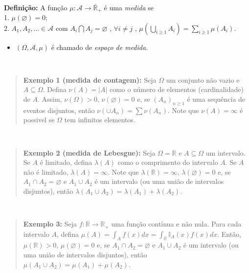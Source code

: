 \documentclass[
]{book}
\providecommand{\tightlist}{%
  \setlength{\itemsep}{0pt}\setlength{\parskip}{0pt}}
\begin{document}
\(~\)

\textbf{Definição:} A função \(\mu: \mathcal{A} \longrightarrow \bar{\mathbb{R}}_+\) é uma \emph{medida} se\\
1. \(\mu(\varnothing) = 0\);\\
2. \(\displaystyle A_1, A_2, \ldots \in \mathcal{A}\) com \(A_i \bigcap A_j = \varnothing\) , \(\forall i \neq j\) , \(\displaystyle \mu\left(\bigcup_{i \geq 1} A_i\right) = \sum_{i \geq 1} \mu\left(A_i\right)\).

\begin{itemize}
\tightlist
\item
  \((\Omega,\mathcal{A}, \mu)\) é chamado de \emph{espaço de medida}.
\end{itemize}

\(~\)

\begin{quote}
\textbf{Exemplo 1 (medida de contagem):} Seja \(\Omega\) um conjunto não vazio e \(A\subseteq \Omega\). Defina \(\nu(A)=|A|\) como o número de elementos (cardinalidade) de \(A\). Assim, \(\nu(\Omega) > 0\), \(\nu(\varnothing)=0\) e, se \((A_n)_{n \geq 1}\) é uma sequência de eventos disjuntos, então \(\nu(\cup A_n) = \sum \nu(A_n)\). Note que \(\nu(A)=\infty\) é possivel se \(\Omega\) tem infinitos elementos.
\end{quote}

\(~\)

\begin{quote}
\textbf{Exemplo 2 (medida de Lebesgue):} Seja \(\Omega=\mathbb{R}\) e \(A\subseteq \Omega\) um intervalo. Se \(A\) é limitado, defina \(\lambda(A)\) como o comprimento do intervalo \(A\). Se \(A\) não é limitado, \(\lambda(A)=\infty\). Note que \(\lambda(\mathbb{R})=\infty\), \(\lambda(\varnothing)=0\) e, se \(A_1 \cap A_2 = \varnothing\) e \(A_1 \cup A_2\) é um intervalo (ou uma união de intervalos disjuntos), então \(\lambda(A_1 \cup A_2) = \lambda(A_1) + \lambda(A_2)\).
\end{quote}

\(~\)

\begin{quote}
\textbf{Exemplo 3:} Seja \(f: \mathbb{R} \longrightarrow \mathbb{R}_+\) uma função contínua e não nula. Para cada intervalo \(A\), defina \(\displaystyle \mu(A) = \int_A f(x) dx = \int_{\mathbb{R}} \mathbb{I}_A(x) f(x) dx\). Então, \(\mu(\mathbb{R})>0\), \(\mu(\varnothing)=0\) e, se \(A_1 \cap A_2 = \varnothing\) e \(A_1 \cup A_2\) é um intervalo (ou uma união de intervalos disjuntos), então \(\mu(A_1 \cup A_2) = \mu(A_1) + \mu(A_2)\).
\end{quote}
\end{document}
